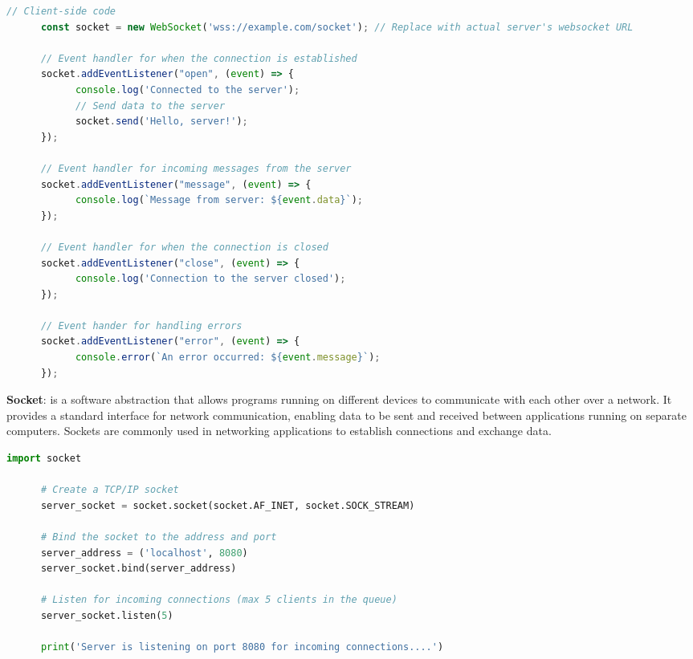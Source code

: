 \begin{multicols}{2}
      \begin{lstlisting}[language=JavaScript, caption=WebSocket's Example]
      // Client-side code
      const socket = new WebSocket('wss://example.com/socket'); // Replace with actual server's websocket URL
      
      // Event handler for when the connection is established
      socket.addEventListener("open", (event) => {
            console.log('Connected to the server');
            // Send data to the server
            socket.send('Hello, server!');
      });

      // Event handler for incoming messages from the server
      socket.addEventListener("message", (event) => {
            console.log(`Message from server: ${event.data}`);	
      });

      // Event handler for when the connection is closed
      socket.addEventListener("close", (event) => {
            console.log('Connection to the server closed');
      });

      // Event hander for handling errors
      socket.addEventListener("error", (event) => {
            console.error(`An error occurred: ${event.message}`);
      });
\end{lstlisting}

      \begin{multicols}{2}
            \textbf{Socket}: is a software abstraction that allows programs running on different devices to
            communicate with each other over a network. It provides a standard interface for network
            communication, enabling data to be sent and received between applications running on separate
            computers. Sockets are commonly used in networking applications to establish connections and
            exchange data.
      \end{multicols}

      \begin{lstlisting}[language=Python, caption=TCP Server Example Using Sockets in Python]
      import socket

      # Create a TCP/IP socket
      server_socket = socket.socket(socket.AF_INET, socket.SOCK_STREAM)

      # Bind the socket to the address and port
      server_address = ('localhost', 8080)
      server_socket.bind(server_address)

      # Listen for incoming connections (max 5 clients in the queue)
      server_socket.listen(5)

      print('Server is listening on port 8080 for incoming connections....')


\end{lstlisting}
\end{multicols}
